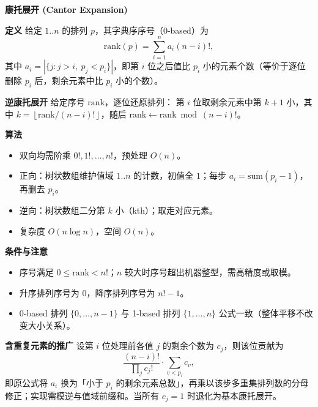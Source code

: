 \textbf{康托展开 (Cantor Expansion)}

\textbf{定义}
给定 $1..n$ 的排列 $p$，其字典序序号（0-based）为
\[
\mathrm{rank}(p) = \sum_{i=1}^{n} a_i (n-i)!,
\]
其中 $a_i = |\{j : j > i,\ p_j < p_i\}|$，即第 $i$ 位之后值比 $p_i$ 小的元素个数（等价于逐位删除 $p_i$ 后，剩余元素中比 $p_i$ 小的个数）。

\textbf{逆康托展开}
给定序号 $\mathrm{rank}$，逐位还原排列：
第 $i$ 位取剩余元素中第 $k+1$ 小，其中 $k = \left\lfloor \mathrm{rank} / (n-i)! \right\rfloor$，随后 $\mathrm{rank} \leftarrow \mathrm{rank} \bmod (n-i)!$。

\textbf{算法}
\begin{itemize}
    \item 双向均需阶乘 $0!, 1!, \ldots, n!$，预处理 $O(n)$。
    \item 正向：树状数组维护值域 $1..n$ 的计数，初值全 $1$；每步 $a_i = \mathrm{sum}(p_i-1)$，再删去 $p_i$。
    \item 逆向：树状数组二分第 $k$ 小（kth）；取走对应元素。
    \item 复杂度 $O(n \log n)$，空间 $O(n)$。
\end{itemize}

\textbf{条件与注意}
\begin{itemize}
    \item 序号满足 $0 \le \mathrm{rank} < n!$；$n$ 较大时序号超出机器整型，需高精度或取模。
    \item 升序排列序号为 $0$，降序排列序号为 $n!-1$。
    \item 0-based 排列 $\{0,\ldots,n-1\}$ 与 1-based 排列 $\{1,\ldots,n\}$ 公式一致（整体平移不改变大小关系）。
\end{itemize}

\textbf{含重复元素的推广}
设第 $i$ 位处理前各值 $j$ 的剩余个数为 $c_j$，则该位贡献为
\[
\frac{(n-i)!}{\prod_j c_j!} \cdot \sum_{v < p_i} c_v,
\]
即原公式将 $a_i$ 换为「小于 $p_i$ 的剩余元素总数」，再乘以该步多重集排列数的分母修正；实现需模逆与值域前缀和。当所有 $c_j=1$ 时退化为基本康托展开。
